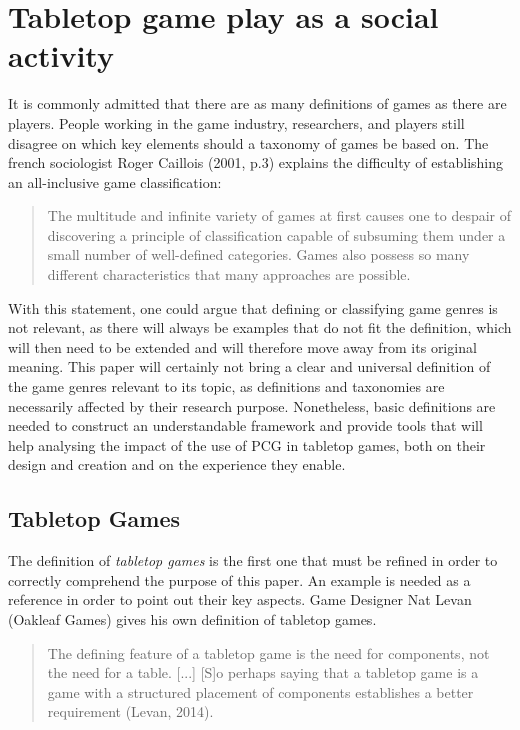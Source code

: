 \section{Tabletop game play as a social activity}
It is commonly admitted that there are as many definitions of games as there are players. People working in the game industry, researchers, and players still disagree on which key elements should a taxonomy of games be based on. The french sociologist Roger Caillois (2001, p.3)\cite{book:mpg} explains the difficulty of establishing an all-inclusive game classification:
\begin{quotation}
The multitude and infinite variety of games at first causes one to despair of discovering a principle of classification capable of subsuming them under a small number of well-defined categories. Games also possess so many different characteristics that many approaches are possible.
\end{quotation} 
With this statement, one could argue that defining or classifying game genres is not relevant, as there will always be examples that do not fit the definition, which will then need to be extended and will therefore move away from its original meaning. This paper will certainly not bring a clear and universal definition of the game genres relevant to its topic, as definitions and taxonomies are necessarily affected by their research purpose. Nonetheless, basic definitions are needed to construct an understandable framework and provide tools that will help analysing the impact of the use of PCG in tabletop games, both on their design and creation and on the experience they enable.\subsection{Tabletop Games}
The definition of \textit{tabletop games} is the first one that must be refined in order to correctly comprehend the purpose of this paper. An example is needed as a reference in order to point out their key aspects. Game Designer Nat Levan (Oakleaf Games) gives his own definition of tabletop games. 
\begin{quotation}
The defining feature of a tabletop game is the need for components, not the need for a table. [...] [S]o perhaps saying that a tabletop game is a game with a structured placement of components establishes a better requirement (Levan, 2014)\cite{web:oak}.
\end{quotation}
